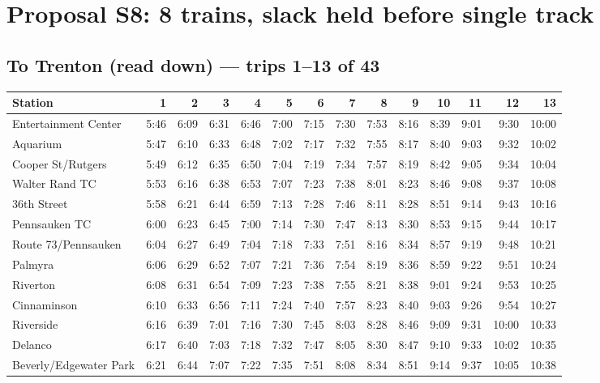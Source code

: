 \section{Proposal S8: 8 trains, slack held before single track}\label{tt:proposal_S8}
\subsection*{To Trenton (read down) --- trips 1--13 of 43}
\begin{center}\footnotesize\setlength{\tabcolsep}{3pt}\begin{tabular}{@{}lrrrrrrrrrrrrr@{}}\toprule
Station & 1 & 2 & 3 & 4 & 5 & 6 & 7 & 8 & 9 & 10 & 11 & 12 & 13 \\\midrule
Entertainment Center & 5:46 & 6:09 & 6:31 & 6:46 & 7:00 & 7:15 & 7:30 & 7:53 & 8:16 & 8:39 & 9:01 & 9:30 & 10:00 \\
Aquarium & 5:47 & 6:10 & 6:33 & 6:48 & 7:02 & 7:17 & 7:32 & 7:55 & 8:17 & 8:40 & 9:03 & 9:32 & 10:02 \\
Cooper St/Rutgers & 5:49 & 6:12 & 6:35 & 6:50 & 7:04 & 7:19 & 7:34 & 7:57 & 8:19 & 8:42 & 9:05 & 9:34 & 10:04 \\
Walter Rand TC & 5:53 & 6:16 & 6:38 & 6:53 & 7:07 & 7:23 & 7:38 & 8:01 & 8:23 & 8:46 & 9:08 & 9:37 & 10:08 \\
36th Street & 5:58 & 6:21 & 6:44 & 6:59 & 7:13 & 7:28 & 7:46 & 8:11 & 8:28 & 8:51 & 9:14 & 9:43 & 10:16 \\
Pennsauken TC & 6:00 & 6:23 & 6:45 & 7:00 & 7:14 & 7:30 & 7:47 & 8:13 & 8:30 & 8:53 & 9:15 & 9:44 & 10:17 \\
Route 73/Pennsauken & 6:04 & 6:27 & 6:49 & 7:04 & 7:18 & 7:33 & 7:51 & 8:16 & 8:34 & 8:57 & 9:19 & 9:48 & 10:21 \\
Palmyra & 6:06 & 6:29 & 6:52 & 7:07 & 7:21 & 7:36 & 7:54 & 8:19 & 8:36 & 8:59 & 9:22 & 9:51 & 10:24 \\
Riverton & 6:08 & 6:31 & 6:54 & 7:09 & 7:23 & 7:38 & 7:55 & 8:21 & 8:38 & 9:01 & 9:24 & 9:53 & 10:25 \\
Cinnaminson & 6:10 & 6:33 & 6:56 & 7:11 & 7:24 & 7:40 & 7:57 & 8:23 & 8:40 & 9:03 & 9:26 & 9:54 & 10:27 \\
Riverside & 6:16 & 6:39 & 7:01 & 7:16 & 7:30 & 7:45 & 8:03 & 8:28 & 8:46 & 9:09 & 9:31 & 10:00 & 10:33 \\
Delanco & 6:17 & 6:40 & 7:03 & 7:18 & 7:32 & 7:47 & 8:05 & 8:30 & 8:47 & 9:10 & 9:33 & 10:02 & 10:35 \\
Beverly/Edgewater Park & 6:21 & 6:44 & 7:07 & 7:22 & 7:35 & 7:51 & 8:08 & 8:34 & 8:51 & 9:14 & 9:37 & 10:05 & 10:38 \\

\end{tabular}
\end{center}
